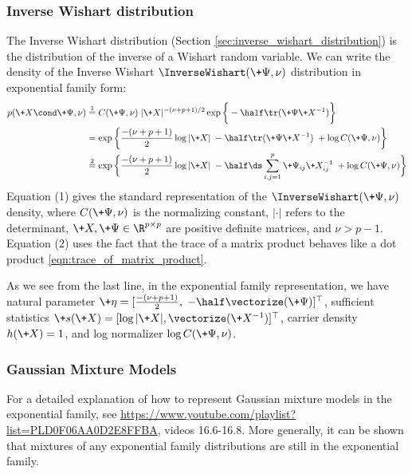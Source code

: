 \documentclass{article} %
\newcommand{\sufficientStatsFunction}{\+s}
\newcommand{\carrierDensity}{h}
\newcommand{\naturalParam}{\+\eta}
\begin{document}
\subsubsection{Inverse Wishart distribution}

\begin{example}
 The Inverse Wishart distribution (Section \ref{sec:inverse_wishart_distribution}) is the distribution of the inverse of a Wishart random variable.   We can write the density of the Inverse Wishart $\InverseWishart(\+\Psi,  \nu)$ distribution in exponential family form:
\begin{align*}
p (\+X  \cond \+\Psi,  \nu) & \stackrel{1}{=} C(\+\Psi,  \nu) \; | \+X | ^{-(\nu + p + 1)/2} \exp \bigg\{ -\half \tr (\+\Psi \+X^{-1} ) \bigg\} \\
& = \exp \bigg\{ \frac{-(\nu + p + 1)}{2}  \log | \+ X | \;  -\half \tr (\+\Psi \+X^{-1} )  \; + \log  C(\+\Psi,  \nu)   \bigg\} \\
& \stackrel{2}{=} \exp \bigg\{ \frac{-(\nu + p + 1)}{2}  \log | \+ X | \;  -\half  \ds\sum_{i,j=1}^p \+\Psi_{ij} \+X^{-1}_{ij} \; + \log  C(\+\Psi,  \nu)   \bigg\} 
\end{align*}
Equation (1) gives the standard representation of the $\InverseWishart(\+\Psi,  \nu)$ density,  where   $C(\+\Psi,  \nu)$ is the normalizing constant,  $| \cdot |$ refers to the determinant,  $\+X,  \+\Psi \in \R^{p \times p}$ are positive definite matrices,  and $\nu > p-1$.    Equation (2) uses the fact that the trace of a matrix product behaves like a dot product \eqref{eqn:trace_of_matrix_product}.      


As we see from the last line,  in the exponential family representation,  we have natural parameter $\naturalParam = [\frac{-(\nu + p + 1)}{2},  \; -\half \vectorize (\+\Psi)]^\top$, sufficient statistics $\sufficientStatsFunction(\+X) = [\log | \+X | , \vectorize (\+X^{-1})]^\top$, carrier density $\carrierDensity(\+X)=1$, and log normalizer $ \log  C(\+\Psi,  \nu)$.   
\label{ex:inverse_wishart_as_ef}
\end{example} 



\subsubsection{Gaussian Mixture Models}


For a detailed explanation of how to represent Gaussian mixture models in the exponential family, see \url{https://www.youtube.com/playlist?list=PLD0F06AA0D2E8FFBA}, videos 16.6-16.8. More generally, it can be shown that mixtures of any exponential family distributions are still in the exponential family. 
\end{document}
